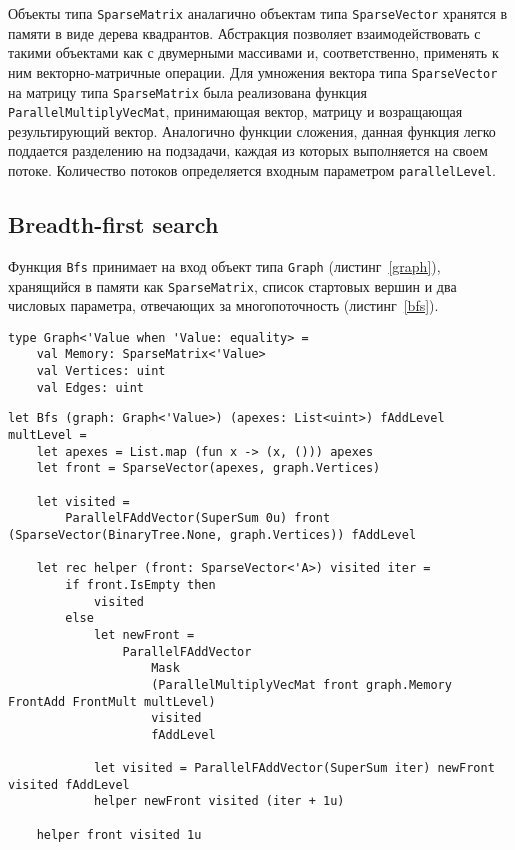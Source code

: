 Объекты типа \texttt{SparseMatrix} аналагично объектам типа \texttt{SparseVector} хранятся в памяти в виде дерева квадрантов. Абстракция позволяет взаимодействовать с такими объектами как с двумерными массивами и, соответственно, применять к ним векторно-матричные операции. Для умножения вектора типа \texttt{SparseVector} на матрицу типа \texttt{SparseMatrix} была реализована функция \texttt{ParallelMultiplyVecMat}, принимающая вектор, матрицу и возращающая результирующий вектор. Аналогично функции сложения, данная функция легко поддается разделению на подзадачи, каждая из которых выполняется на своем потоке. Количество потоков определяется входным параметром \texttt{parallelLevel}.

\subsection{Breadth-first search}
Функция \texttt{Bfs} принимает на вход объект типа \texttt{Graph} (листинг~\ref{graph}), хранящийся в памяти как \texttt{SparseMatrix}, список стартовых вершин и два числовых параметра, отвечающих за многопоточность (листинг~\ref{bfs}).

\begin{lstlisting}[style=codelistingstyle, caption={Тип Graph},label={graph}, frame=single]
type Graph<'Value when 'Value: equality> =
    val Memory: SparseMatrix<'Value>
    val Vertices: uint
    val Edges: uint
\end{lstlisting}

\begin{lstlisting}[style=codelistingstyle, caption={Алгоритм Bfs с использованием векторно-матричных операций},label={bfs}, frame=single]
let Bfs (graph: Graph<'Value>) (apexes: List<uint>) fAddLevel multLevel =
    let apexes = List.map (fun x -> (x, ())) apexes
    let front = SparseVector(apexes, graph.Vertices)

    let visited =
        ParallelFAddVector(SuperSum 0u) front (SparseVector(BinaryTree.None, graph.Vertices)) fAddLevel

    let rec helper (front: SparseVector<'A>) visited iter =
        if front.IsEmpty then
            visited
        else
            let newFront =
                ParallelFAddVector
                    Mask
                    (ParallelMultiplyVecMat front graph.Memory FrontAdd FrontMult multLevel)
                    visited
                    fAddLevel

            let visited = ParallelFAddVector(SuperSum iter) newFront visited fAddLevel
            helper newFront visited (iter + 1u)

    helper front visited 1u
\end{lstlisting}


